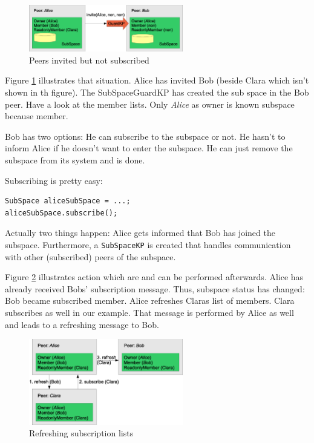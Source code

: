 \begin{figure}[t]
\centering
\includegraphics[width=0.60\textwidth]{subspaceAfterInvitation.eps}
\caption{Peers invited but not subscribed}
\label{fig:subspaceAfterInvitation}
\end{figure}

Figure \ref{fig:subspaceAfterInvitation} illustrates that situation.
Alice has invited Bob (beside Clara which isn't shown in th figure). The 
SubSpaceGuardKP has created the sub space in the Bob peer. Have a look
at the member lists. Only {\it Alice} as owner is known subspace because member.

Bob has two options: He can subscribe to the subspace or not. He hasn't to inform Alice if he doesn't want to enter the subspace. He can just remove the subspace from its system and is done.

Subscribing is pretty easy:

\begin{verbatim}
SubSpace aliceSubSpace = ...;
aliceSubSpace.subscribe();
\end{verbatim}

Actually two things happen: Alice gets informed that Bob has joined the subspace. Furthermore, a {\verb|SubSpaceKP|} is created that handles communication with other (subscribed) peers of the subspace.

Figure \ref{fig:subSpaceRefreshing} illustrates action which are and can
be performed afterwards. Alice has already received Bobs' subscription message. 
Thus, subspace status has changed: Bob became subscribed member. Alice refreshes
Claras list of members. Clara subscribes as well in our example. That message
is performed by Alice as well and leads to a refreshing message to Bob.

\begin{figure}[t]
\centering
\includegraphics[width=0.60\textwidth]{subSpaceRefreshing.eps}
\caption{Refreshing subscription lists}
\label{fig:subSpaceRefreshing}
\end{figure}

